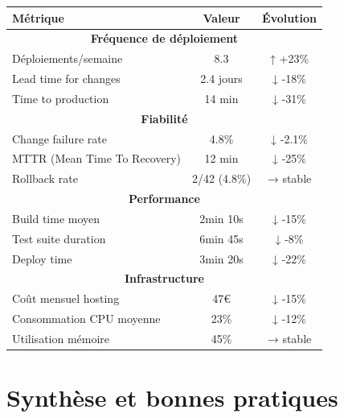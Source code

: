 \begin{tcolorbox}[colback=green!5!white,colframe=green!60!black,title=\textbf{Tableau de bord déploiement - Production (Q4 2024)}]
\begin{center}
\begin{tabular}{|l|c|c|}
\hline
\textbf{Métrique} & \textbf{Valeur} & \textbf{Évolution} \\
\hline
\multicolumn{3}{|c|}{\textbf{Fréquence de déploiement}} \\
\hline
Déploiements/semaine & 8.3 & ↑ +23\% \\
Lead time for changes & 2.4 jours & ↓ -18\% \\
Time to production & 14 min & ↓ -31\% \\
\hline
\multicolumn{3}{|c|}{\textbf{Fiabilité}} \\
\hline
Change failure rate & 4.8\% & ↓ -2.1\% \\
MTTR (Mean Time To Recovery) & 12 min & ↓ -25\% \\
Rollback rate & 2/42 (4.8\%) & → stable \\
\hline
\multicolumn{3}{|c|}{\textbf{Performance}} \\
\hline
Build time moyen & 2min 10s & ↓ -15\% \\
Test suite duration & 6min 45s & ↓ -8\% \\
Deploy time & 3min 20s & ↓ -22\% \\
\hline
\multicolumn{3}{|c|}{\textbf{Infrastructure}} \\
\hline
Coût mensuel hosting & 47€ & ↓ -15\% \\
Consommation CPU moyenne & 23\% & ↓ -12\% \\
Utilisation mémoire & 45\% & → stable \\
\hline
\end{tabular}
\end{center}
\end{tcolorbox}

\section{Synthèse et bonnes pratiques}


